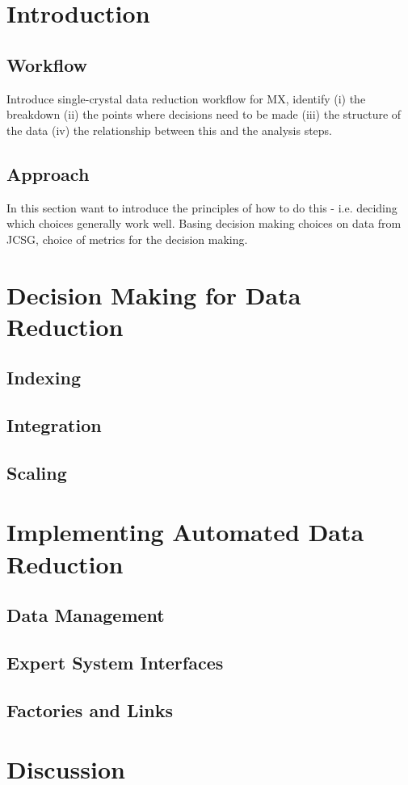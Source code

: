 \documentclass[a4paper,11pt]{article}
\begin{document}
\section{Introduction}

\subsection{Workflow}

Introduce single-crystal data reduction workflow for MX, identify (i) the breakdown (ii) the points where decisions need to be made (iii) the structure of the data (iv) the relationship between this and the analysis steps.

\subsection{Approach}

In this section want to introduce the principles of how to do this - i.e. deciding which choices generally work well. Basing decision making choices on data from JCSG, choice of metrics for the decision making.

\section{Decision Making for Data Reduction}

\subsection{Indexing}

\subsection{Integration}

\subsection{Scaling}

\section{Implementing Automated Data Reduction}

\subsection{Data Management}

\subsection{Expert System Interfaces}

\subsection{Factories and Links}

\section{Discussion}
\end{document}
